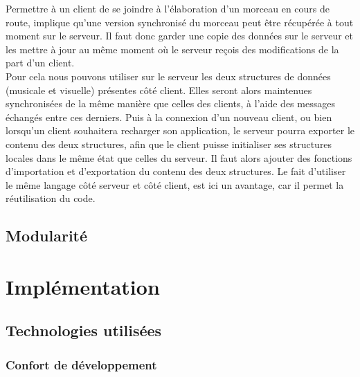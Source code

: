 \documentclass[pdftex,12pt,a4paper]{article}
\begin{document}
Permettre à un client de se joindre à l’élaboration d’un morceau en cours de route, implique qu’une version synchronisé du morceau peut être récupérée à tout moment sur le serveur. Il faut donc garder une copie des données sur le serveur et les mettre à jour au même moment où le serveur reçois des modifications de la part d’un client.\\
Pour cela nous pouvons utiliser sur le serveur les deux structures de données (musicale et visuelle) présentes côté client. Elles seront alors maintenues synchronisées de la même manière que celles des clients, à l’aide des messages échangés entre ces derniers. Puis à la connexion d’un nouveau client, ou bien lorsqu’un client souhaitera recharger son application, le serveur pourra exporter le contenu des deux structures, afin que le client puisse initialiser ses structures locales dans le même état que celles du serveur. Il faut alors ajouter des fonctions d’importation et d’exportation du contenu des deux structures. Le fait d’utiliser le même langage côté serveur et côté client, est ici un avantage, car il permet la réutilisation du code.

\subsection{Modularité}


\section{Implémentation}

\subsection{Technologies utilisées}

\subsubsection{Confort de développement}
\end{document}
